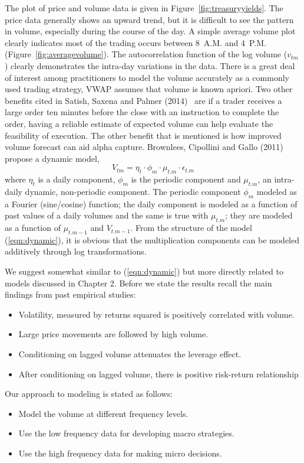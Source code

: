 The plot of price and volume data is given in Figure~\ref{fig:treasuryyields}. The price data generally shows an upward trend, but it is difficult to see the pattern in volume, especially during the course of the day. A simple average volume plot clearly indicates most of the trading occurs between 8~A.M. and 4~P.M. (Figure~\ref{fig:averagevolume}). The autocorrelation function of the log volume ($v_{tm}$) clearly demonstrates the intra-day variations in the data. There is a great deal of interest among practitioners to model the volume accurately as a commonly used trading strategy, VWAP assumes that volume is known apriori. Two other benefits cited in Satish, Saxena and Palmer (2014)~\cite{satish} are if a trader receives a large order ten minutes before the close with an instruction to complete the order, having a reliable estimate of expected volume can help evaluate the feasibility of execution. The other benefit that is mentioned is how improved volume forecast can aid alpha capture. Brownlees, Cipollini and Gallo (2011)~\cite{brownless} propose a dynamic model,
	\begin{equation}\label{eqn:dynamic}
	V_{tm}= \eta_t \cdot \phi_m \cdot \mu_{t.m} \cdot \epsilon_{t.m}
	\end{equation}
where $\eta_t$ is a daily component, $\phi_m$ is the periodic component and $\mu_{t.m}$, an intra-daily dynamic, non-periodic component. The periodic component $\phi_m$ modeled as a Fourier (sine/cosine) function; the daily component is modeled as a function of past values of a daily volumes and the same is true with $\mu_{t.m}$; they are modeled as a function of $\mu_{t.m-1}$ and $V_{t.m-1}$. From the structure of the model (\ref{eqn:dynamic}), it is obvious that the multiplication components can be modeled additively through log transformations.


We suggest somewhat similar to (\ref{eqn:dynamic}) but more directly related to models discussed in Chapter 2. Before we state the results recall the main findings from past empirical studies:
	\begin{itemize}
	\item Volatility, measured by returns squared is positively correlated with volume.
	\item Large price movements are followed by high volume.
	\item Conditioning on lagged volume attenuates the leverage effect.
	\item After conditioning on lagged volume, there is positive risk-return relationship
	\end{itemize}
Our approach to modeling is stated as follows:
	\begin{itemize}
	\item Model the volume at different frequency levels.
	\item Use the low frequency data for developing macro strategies.
	\item Use the high frequency data for making micro decisions.
	\end{itemize}

